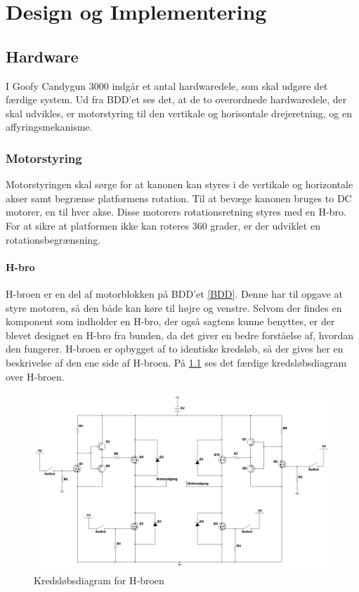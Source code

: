 \chapter{Design og Implementering}

\section{Hardware}
I Goofy Candygun 3000 indgår et antal hardwaredele, som skal udgøre det færdige system. Ud fra BDD'et ses det, at de to overordnede hardwaredele, der skal udvikles, er motorstyring til den vertikale og horisontale drejeretning, og en affyringsmekanisme. 

\subsection{Motorstyring}
Motorstyringen skal sørge for at kanonen kan styres i de vertikale og horizontale akser samt begrænse platformens rotation. Til at bevæge kanonen  bruges to DC motorer, en til hver akse. Disse motorers rotationsretning styres med en H-bro. For at sikre at platformen ikke kan roteres 360 grader, er der udviklet en rotationsbegrænsning. 

\subsubsection{H-bro}
H-broen er en del af motorblokken på BDD'et \ref{BDD}. Denne har til opgave at styre motoren, så den både kan køre til højre og venstre. Selvom der findes en komponent som indholder en H-bro, der også sagtens kunne benyttes, er der blevet designet en H-bro fra bunden, da det giver en bedre forståelse af, hvordan den fungerer. H-broen er opbygget af to identiske kredsløb, så der gives her en beskrivelse af den ene side af H-broen. På \ref{fig:hbro} ses det færdige kredsløbsdiagram over H-broen. 

\begin{figure}[H]
		\centering
		\includegraphics[width=\textwidth]{Afsnit/DesignOgImplementering/images/H-bro}
		\caption{Kredsløbsdiagram for H-broen}
		\label{fig:hbro}
\end{figure}

